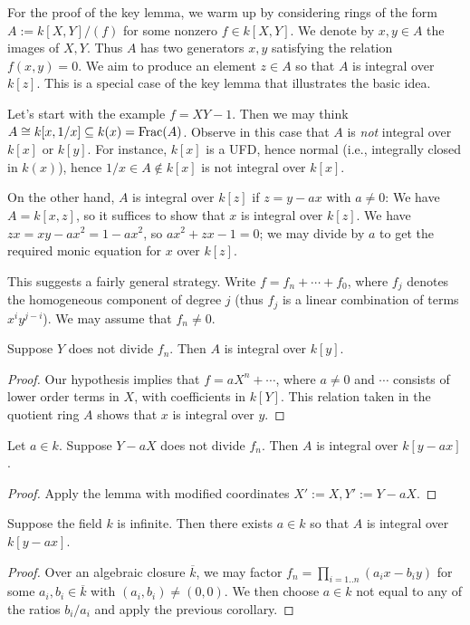 \documentclass[reqno]{amsart}
\begin{document}
For the proof of the key lemma,
we warm up by considering rings of the form
\(A := k[X,Y]/(f)\)
for some nonzero \(f \in k[X,Y]\).
We denote by \(x,y \in A\) the images of \(X,Y\).
Thus \(A\) has two generators \(x,y\)
satisfying the relation \(f(x,y) = 0\).
We aim to produce an element \(z \in A\) so that
\(A\) is integral over \(k[z]\).
This is a special case of the key lemma that illustrates
the basic idea.

Let's start with the example \(f = X Y - 1\).
Then we may think
\(A \cong k[x,1/x] \subseteq k(x) = \operatorname{Frac}(A)\).
Observe in this case that \(A\) is \emph{not} integral over \(k[x]\)
or \(k[y]\).
For instance, \(k[x]\) is a UFD,
hence normal
(i.e., integrally closed in \(k(x)\)),
hence \(1/x \in A \notin k[x]\) is not integral over \(k[x]\).

On the other hand,
\(A\) is integral over \(k[z]\)
if \(z = y - a x\) with \(a \neq 0\):
We have \(A = k[x,z]\),
so it suffices
to show that \(x\) is integral over \(k[z]\).
We have \(z x = x y - a x^2 = 1 - a x^2\),
so \(a x^2 + z x - 1 = 0\);
we may
divide by \(a\) to get the required monic equation
for \(x\) over \(k[z]\).

This suggests a fairly general strategy.  Write
\(f = f_n + \dotsb + f_0\), where \(f_j\) denotes the homogeneous
component of degree \(j\) (thus \(f_j\) is a linear combination of
terms \(x^i y^{j-i}\)).
We may assume that \(f_n \neq 0\).

\begin{lemma}
  Suppose $Y$ does not divide $f_n$.  Then $A$ is integral over
  $k[y]$.
\end{lemma}
\begin{proof}
  Our hypothesis implies that $f = a X^n + \dotsb$, where
  $a \neq 0$ and $\dotsb$ consists of lower order terms in $X$,
  with coefficients in $k[Y]$.  This relation taken in the
  quotient ring $A$ shows that $x$ is integral over $y$.
\end{proof}
\begin{corollary}
  Let $a \in k$.  Suppose $Y - a X$ does not divide $f_n$.  Then
  $A$ is integral over $k[y - a x]$.
\end{corollary}
\begin{proof}
  Apply the lemma with modified coordinates
  $X' := X, Y ' := Y - a X$.
\end{proof}
\begin{corollary}
  Suppose the field $k$ is infinite.  Then there exists
  $a \in k$ so that $A$ is integral over $k[y-ax]$.
\end{corollary}
\begin{proof}
  Over an algebraic closure $\overline{k}$, we may factor
  $f_n = \prod_{i=1..n} (a_i x - b_i y)$ for some
  $a_i,b_i \in \overline{k}$ with $(a_i,b_i) \neq (0,0)$.  We
  then choose $a \in k$ not equal to any of the ratios $b_i/a_i$
  and apply the previous corollary.
\end{proof}
\end{document}
